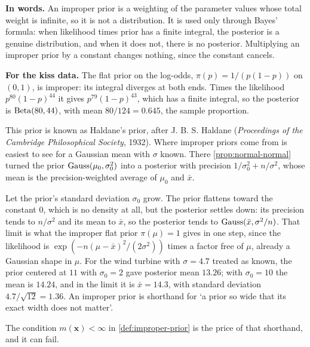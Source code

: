\begin{inwords}
\textbf{In words.} An improper prior is a weighting of the parameter values whose total weight is infinite, so it is not a distribution. It is used only through Bayes' formula: when likelihood times prior has a finite integral, the posterior is a genuine distribution, and when it does not, there is no posterior. Multiplying an improper prior by a constant changes nothing, since the constant cancels.
\par\smallskip
\textbf{For the kiss data.} The flat prior on the log-odds, $\pi(p) = 1/(p(1-p))$ on $(0, 1)$, is improper: its integral diverges at both ends. Times the likelihood $p^{80}(1-p)^{44}$ it gives $p^{79}(1-p)^{43}$, which has a finite integral, so the posterior is $\mathrm{Beta}(80, 44)$, with mean $80/124 = 0.645$, the sample proportion.
\end{inwords}

This prior is known as Haldane's prior, after J. B. S. Haldane (\textit{Proceedings of the Cambridge Philosophical Society}, 1932).
Where improper priors come from is easiest to see for a Gaussian mean with $\sigma$ known.
There \cref{prop:normal-normal} turned the prior $\text{Gauss}(\mu_0, \sigma_0^2)$ into a posterior with precision $1/\sigma_0^2 + n/\sigma^2$, whose mean is the precision-weighted average of $\mu_0$ and $\bar{x}$.

\begin{intuition}
Let the prior's standard deviation $\sigma_0$ grow.
The prior flattens toward the constant $0$, which is no density at all, but the posterior settles down: its precision tends to $n/\sigma^2$ and its mean to $\bar{x}$, so the posterior tends to $\text{Gauss}(\bar{x}, \sigma^2/n)$.
That limit is what the improper flat prior $\pi(\mu) = 1$ gives in one step, since the likelihood is $\exp(-n(\mu - \bar{x})^2/(2\sigma^2))$ times a factor free of $\mu$, already a Gaussian shape in $\mu$.
For the wind turbine with $\sigma = 4.7$ treated as known, the prior centered at $11$ with $\sigma_0 = 2$ gave posterior mean $13.26$; with $\sigma_0 = 10$ the mean is $14.24$, and in the limit it is $\bar{x} = 14.3$, with standard deviation $4.7/\sqrt{12} = 1.36$.
An improper prior is shorthand for `a prior so wide that its exact width does not matter'.
\end{intuition}

The condition $m(\mathbf{x}) < \infty$ in \cref{def:improper-prior} is the price of that shorthand, and it can fail.


